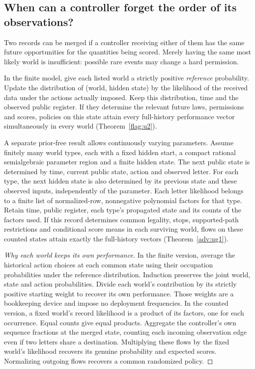 \subsection{When can a controller forget the order of its observations?}\label{body:states}
Two records can be merged if a controller receiving either of them has the same future opportunities for the quantities being scored. Merely having the same most likely world is insufficient: possible rare events may change a hard permission.
\begin{theorem}\label{body:representation}
In the finite model, give each listed world a strictly positive \emph{reference} probability. Update the distribution of (world, hidden state) by the likelihood of the received data under the actions actually imposed. Keep this distribution, time and the observed public register. If they determine the relevant future laws, permissions and scores, policies on this state attain every full-history performance vector simultaneously in every world (Theorem~\ref{flag:u2}).

A separate prior-free result allows continuously varying parameters. Assume finitely many world types, each with a fixed hidden start, a compact rational semialgebraic parameter region and a finite hidden state. The next public state is determined by time, current public state, action and observed letter. For each type, the next hidden state is also determined by its previous state and these observed inputs, independently of the parameter. Each letter likelihood belongs to a finite list of normalized-row, nonnegative polynomial factors for that type. Retain time, public register, each type's propagated state and its counts of the factors used. If this record determines common legality, stops, supported-path restrictions and conditional score means in each surviving world, flows on these counted states attain exactly the full-history vectors (Theorem~\ref{adv:ug1}).
\end{theorem}
\begin{proof}[Why each world keeps its own performance]
In the finite version, average the historical action choices at each common state using their occupation probabilities under the reference distribution. Induction preserves the joint world, state and action probabilities. Divide each world's contribution by its strictly positive starting weight to recover its own performance. Those weights are a bookkeeping device and impose no deployment frequencies. In the counted version, a fixed world's record likelihood is a product of its factors, one for each occurrence. Equal counts give equal products. Aggregate the controller's own sequence fractions at the merged state, counting each incoming observation edge even if two letters share a destination. Multiplying these flows by the fixed world's likelihood recovers its genuine probability and expected scores. Normalizing outgoing flows recovers a common randomized policy.
\end{proof}
